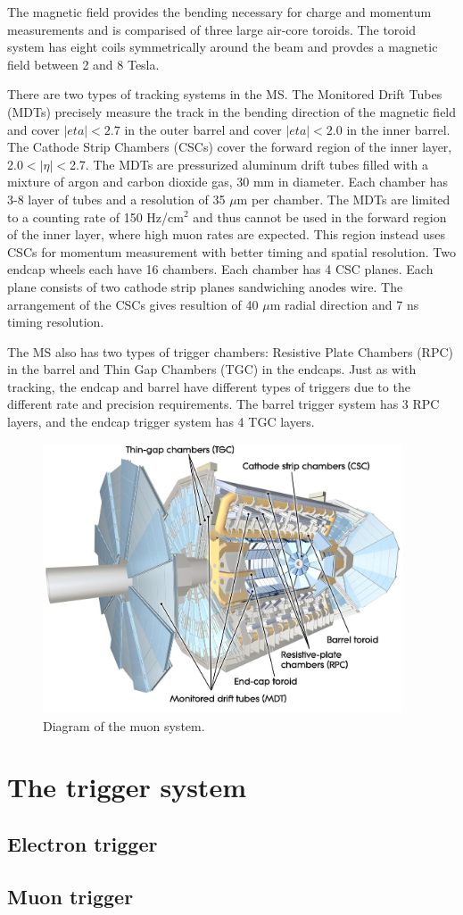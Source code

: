 The magnetic field provides the bending necessary for charge and momentum measurements and is comparised of three large air-core toroids. The toroid system has eight coils symmetrically around the beam and provdes a magnetic field between 2 and 8 Tesla. 

There are two types of tracking systems in the MS. The Monitored Drift Tubes (MDTs) precisely measure the track in the bending direction of the magnetic field and cover $|eta|<2.7$ in the outer barrel and cover $|eta|<2.0$ in the inner barrel. The Cathode Strip Chambers (CSCs) cover the forward region of the inner layer, 2.0$<|\eta|<$2.7. The MDTs are pressurized aluminum drift tubes filled with a mixture of argon and carbon dioxide gas, 30 mm in diameter. Each chamber has 3-8 layer of tubes and a resolution of 35 $\mu$m per chamber. The MDTs are limited to a counting rate of 150 Hz/cm$^2$ and thus cannot be used in the forward region of the inner layer, where high muon rates are expected. This region instead uses CSCs for momentum measurement with better timing and spatial resolution. Two endcap wheels each have 16 chambers. Each chamber has 4 CSC planes. Each plane consists of two cathode strip planes sandwiching anodes wire. The arrangement of the CSCs gives resultion of 40 $\mu$m radial direction and 7 ns timing resolution.

The MS also has two types of trigger chambers: Resistive Plate Chambers (RPC) in the barrel and Thin Gap Chambers (TGC) in the endcaps. Just as with tracking, the endcap and barrel have different types of triggers due to the different rate and precision requirements. The barrel trigger system has 3 RPC layers, and the endcap trigger system has 4 TGC layers. 

\begin{figure}[tp]
\includegraphics[width=0.95\textwidth]{fig/atlas/muonchamb}
\caption{Diagram of the muon system\cite{cern-jinst-atlas}.}
\label{fig:muonOverview}
\end{figure}


\section{The trigger system}

\subsection{Electron trigger}
\subsection{Muon trigger}